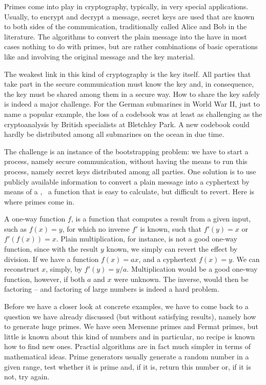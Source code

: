 \documentclass{scrreprt}
\begin{document}
Primes come into play in cryptography, typically,
in very special applications.
Usually, to encrypt and decrypt a message,
secret keys are used that are known to both
sides of the communication, traditionally called
Alice and Bob in the literature.
The algorithms to convert the plain message
into the  have in most cases
nothing to do with primes, but are rather
combinations of basic operations like 
and  involving the original message
and the key material.

The weakest link in this kind of cryptography is 
the key itself. All parties that take part 
in the secure communication must know the key
and, in consequence, the key must be shared among them
in a secure way.
How to share the key safely is indeed a major challenge.
For the German submarines in World War II,
just to name a popular example,
the loss of a codebook was at least as challenging
as the cryptoanalysis by British specialists
at Bletchley Park.
A new codebook could hardly be distributed among
all submarines on the ocean in due time.

The challenge is an instance of the bootstrapping problem:
we have to start a process, namely secure communication,
without having the means to run this process,
namely secret keys distributed among all parties.
One solution is to use publicly available information
to convert a plain message into a cyphertext
by means of a ,
\ie\ a function that is easy to calculate,
but difficult to revert.
Here is where primes come in.

A one-way function $f$, is a function
that computes a result from a given input,
such as $f(x) = y$, for which no inverse
$f'$ is known, such that $f'(y) = x$ or
$f'(f(x)) = x$.
Plain multiplication, for instance, is not
a good one-way function,
since with the result $y$ known, 
we simply can revert 
the effect by division.
If we have a function $f(x) = ax$,
and a cyphertext $f(x) = y$.
We can reconstruct $x$, simply, by $f'(y) = y/a$.
Multiplication would be a good one-way function, however,
if both $a$ and $x$ were unknown.
The inverse, would then be factoring --
and factoring of large numbers is indeed
a hard problem.

Before we have a closer look at concrete examples,
we have to come back to a question we have already discussed
(but without satisfying results),
namely how to generate huge primes.
We have seen Mersenne primes and Fermat primes,
but little is known about this kind of numbers
and in particular, no recipe is known how to find new ones.
Practial algorithms are in fact much simpler
in terms of mathematical ideas.
Prime generators usually generate a random number
in a given range, test whether it is prime and, if it is,
return this number or, if it is not, try again.
\end{document}
